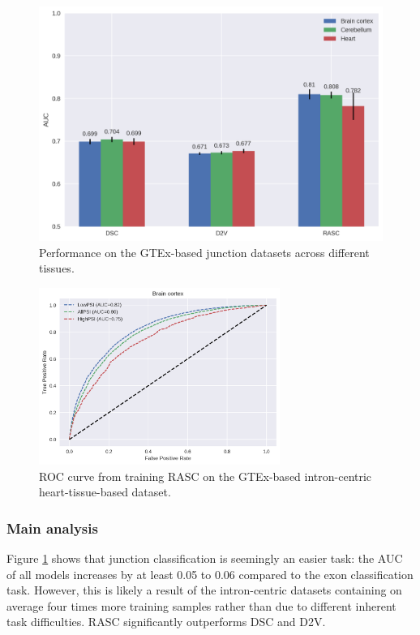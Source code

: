 \begin{figure}[h]
	\centering\includegraphics[width=1\textwidth]{../visualizations/ch5-results/gtex_junc_barcharts.png} 
	\caption{Performance on the GTEx-based junction datasets across different tissues. }
	\label{fig:gtex_junc_barcharts}
\end{figure}


\begin{figure}[h]
	\centering\includegraphics[width=0.7\textwidth]{../visualizations/ch5-results/gtex_junc_brain_roc.png} 
	\caption{ROC curve from training RASC on the GTEx-based intron-centric heart-tissue-based dataset. }
	\label{fig:gtex_junc_rocs}
\end{figure}


\subsubsection{Main analysis}
Figure \ref{fig:gtex_junc_barcharts} shows that junction classification is seemingly an easier task: the AUC of all models increases by at least 0.05 to 0.06 compared to the exon classification task. However, this is likely a result of the intron-centric datasets containing on average four times more training samples rather than due to different inherent task difficulties. RASC significantly outperforms DSC and D2V. 

